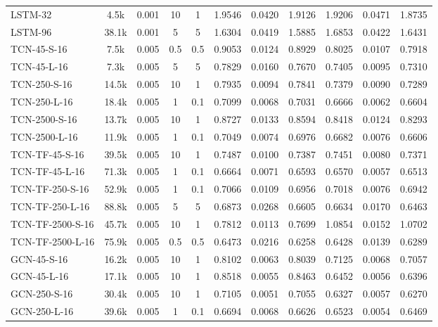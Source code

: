 \begin{table*}[h]
{\begin{tabular}{l c c cc >{\columncolor{gray!20}}ccc >{\columncolor{gray!20}}ccc}
            \hline
            LSTM-32 & 4.5k & 0.001 & 10 & 1 & 1.9546 & 0.0420 & 1.9126 & 1.9206 & 0.0471 & 1.8735 \\
            LSTM-96 & 38.1k & 0.001 & 5 & 5 & 1.6304 & 0.0419 & 1.5885 & 1.6853 & 0.0422 & 1.6431 \\
            \hline
            TCN-45-S-16 & 7.5k & 0.005 & 0.5 & 0.5 & 0.9053 & 0.0124 & 0.8929 & 0.8025 & 0.0107 & 0.7918 \\
            TCN-45-L-16 & 7.3k & 0.005 & 5 & 5 & 0.7829 & 0.0160 & 0.7670 & 0.7405 & 0.0095 & 0.7310 \\
            TCN-250-S-16 & 14.5k & 0.005 & 10 & 1 & 0.7935 & 0.0094 & 0.7841 & 0.7379 & 0.0090 & 0.7289 \\
            TCN-250-L-16 & 18.4k & 0.005 & 1 & 0.1 & 0.7099 & 0.0068 & 0.7031 & 0.6666 & 0.0062 & 0.6604 \\
            TCN-2500-S-16 & 13.7k & 0.005 & 10 & 1 & 0.8727 & 0.0133 & 0.8594 & 0.8418 & 0.0124 & 0.8293 \\
            TCN-2500-L-16 & 11.9k & 0.005 & 1 & 0.1 & 0.7049 & 0.0074 & 0.6976 & 0.6682 & 0.0076 & 0.6606 \\
            \hline
            TCN-TF-45-S-16 & 39.5k & 0.005 & 10 & 1 & 0.7487 & 0.0100 & 0.7387 & 0.7451 & 0.0080 & 0.7371 \\
            TCN-TF-45-L-16 & 71.3k & 0.005 & 1 & 0.1 & 0.6664 & 0.0071 & 0.6593 & 0.6570 & 0.0057 & 0.6513 \\
            TCN-TF-250-S-16 & 52.9k & 0.005 & 1 & 0.1 & 0.7066 & 0.0109 & 0.6956 & 0.7018 & 0.0076 & 0.6942 \\
            TCN-TF-250-L-16 & 88.8k & 0.005 & 5 & 5 & 0.6873 & 0.0268 & 0.6605 & 0.6634 & 0.0170 & 0.6463 \\
            TCN-TF-2500-S-16 & 45.7k & 0.005 & 10 & 1 & 0.7812 & 0.0113 & 0.7699 & 1.0854 & 0.0152 & 1.0702 \\
            TCN-TF-2500-L-16 & 75.9k & 0.005 & 0.5 & 0.5 & 0.6473 & 0.0216 & 0.6258 & 0.6428 & 0.0139 & 0.6289 \\
            \hline
            GCN-45-S-16 & 16.2k & 0.005 & 10 & 1 & 0.8102 & 0.0063 & 0.8039 & 0.7125 & 0.0068 & 0.7057 \\
            GCN-45-L-16 & 17.1k & 0.005 & 10 & 1 & 0.8518 & 0.0055 & 0.8463 & 0.6452 & 0.0056 & 0.6396 \\
            GCN-250-S-16 & 30.4k & 0.005 & 10 & 1 & 0.7105 & 0.0051 & 0.7055 & 0.6327 & 0.0057 & 0.6270 \\
            GCN-250-L-16 & 39.6k & 0.005 & 1 & 0.1 & 0.6694 & 0.0068 & 0.6626 & 0.6523 & 0.0054 & 0.6469 \\

\end{tabular}}
\end{table*}
